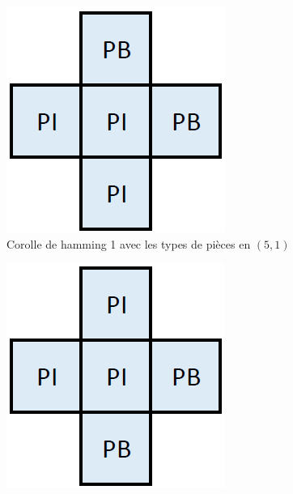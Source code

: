 \begin{exmp}
\begin{minipage}{0.24\textwidth}
\begin{figure}[H]
				\centering
				\includegraphics[width=\linewidth]{images/corolle_zone_orientee_1}
				\caption{Corolle de hamming 1 avec les types de pièces en $(5,1)$ }
				\label{fig:corolle_zone_orientee_1}
			\end{figure}
		\end{minipage}\hfill
		\begin{minipage}{0.24\textwidth}
			\begin{figure}[H]
				\centering
				\includegraphics[width=\linewidth]{images/corolle_zone_orientee_2}

\end{figure}
\end{minipage}
\end{exmp}
